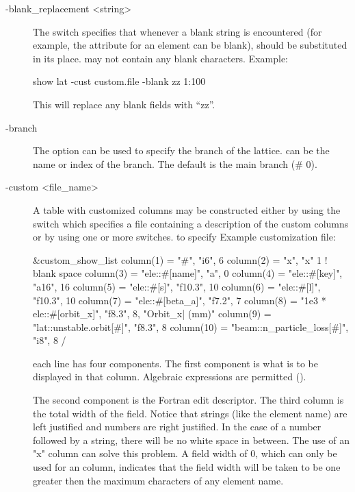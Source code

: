 {{{{{{{{\begin{description}
%
\item[-blank_replacement <string>] \Newline
The  switch specifies that whenever a blank string is
encountered (for example, the  attribute for an element can be blank),  should
be substituted in its place.  may not contain any blank characters. Example:
\begin{example}
  show lat -cust custom.file -blank zz 1:100
\end{example}
This will replace any blank fields with ``zz''.
%
\item[-branch] \Newline
The  option can be used to specify the branch of the lattice. 
 can be the name or index of the branch.  The default is the main
branch (\# 0).
%
\item[-custom <file_name>] \Newline
A table with customized columns may be constructed either by using the  switch which
specifies a file containing a description of the custom columns or by using one or more  switches.
to specify  Example customization file:
\begin{example}
  &custom_show_list
    column(1)  = "#",                      "i6",     6 
    column(2)  = "x",                      "x"       1   ! blank space
    column(3)  = "ele::#[name]",           "a",      0
    column(4)  = "ele::#[key]",            "a16",   16
    column(5)  = "ele::#[s]",              "f10.3", 10
    column(6)  = "ele::#[l]",              "f10.3", 10
    column(7)  = "ele::#[beta_a]",         "f7.2",   7
    column(8)  = "1e3 * ele::#[orbit_x]",  "f8.3",   8, "Orbit_x| (mm)" 
    column(9)  = "lat::unstable.orbit[#]", "f8.3",   8 
    column(10) = "beam::n_particle_loss[#]", "i8",   8 
  /
\end{example}
each  line has four components. The first component is what is to be displayed in that
column. Algebraic expressions are permitted ().

The second component is the Fortran edit descriptor. The third column is the total width of the
field. Notice that strings (like the element name) are left justified and numbers are right
justified. In the case of a number followed by a string, there will be no white space in
between. The use of an "x" column can solve this problem. A field width of 0, which can only be used
for an  column, indicates that the field width will be taken to be one greater
then the maximum characters of any element name.


\end{description}}}}}}}}}
